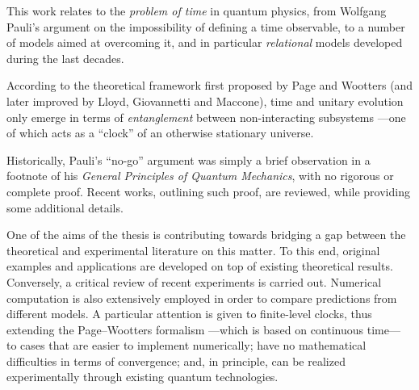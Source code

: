 This work relates to the \emph{problem of time} in quantum physics,
from Wolfgang Pauli's argument
on the impossibility of defining a time observable, %
to a number of models aimed at overcoming it,
and in particular \emph{relational} models
developed during the last decades.

According to the theoretical framework first proposed by Page and Wootters
(and later improved by Lloyd, Giovannetti and Maccone),
time and unitary evolution only emerge in
terms of \emph{entanglement} between non-interacting subsystems
---one of which acts as a ``clock''
of an otherwise stationary universe. %

Historically, Pauli's ``no-go'' argument was simply a brief observation in a footnote
of his \textit{General Principles of Quantum Mechanics},
with no rigorous or complete proof. Recent works, outlining such proof, are
reviewed, while providing some additional details.

One of the aims of the thesis
is contributing towards bridging a gap between the theoretical
and experimental literature on this matter.
To this end, original examples and applications are developed on top of existing theoretical results.  
Conversely,
a critical review
of recent experiments is carried out.
Numerical computation is also extensively employed in order to compare
predictions from different models. A particular attention is given
to finite-level clocks,
thus extending the Page--Wootters formalism ---which is based on continuous time---
to cases that are easier to implement numerically;
have no mathematical difficulties in terms of convergence;
and, in principle, can be realized experimentally through existing quantum technologies. 